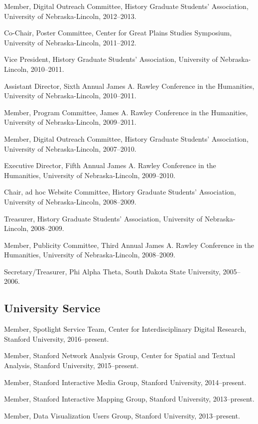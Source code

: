 Member, Digital Outreach Committee, History Graduate Students'
Association, University of Nebraska-Lincoln, 2012--2013.

Co-Chair, Poster Committee, Center for Great Plains Studies Symposium,
University of Nebraska-Lincoln, 2011--2012.

Vice President, History Graduate Students' Association, University of
Nebraska-Lincoln, 2010--2011.

Assistant Director, Sixth Annual James A. Rawley Conference in the
Humanities, University of Nebraska-Lincoln, 2010--2011.

Member, Program Committee, James A. Rawley Conference in the Humanities,
University of Nebraska-Lincoln, 2009--2011.

Member, Digital Outreach Committee, History Graduate Students'
Association, University of Nebraska-Lincoln, 2007--2010.

Executive Director, Fifth Annual James A. Rawley Conference in the
Humanities, University of Nebraska-Lincoln, 2009--2010.

Chair, ad hoc Website Committee, History Graduate Students' Association,
University of Nebraska-Lincoln, 2008--2009.

Treasurer, History Graduate Students' Association, University of
Nebraska-Lincoln, 2008--2009.

Member, Publicity Committee, Third Annual James A. Rawley Conference in
the Humanities, University of Nebraska-Lincoln, 2008--2009.

Secretary/Treasurer, Phi Alpha Theta, South Dakota State University,
2005--2006.

\subsection{University Service}\label{university-service}

Member, Spotlight Service Team, Center for Interdisciplinary Digital
Research, Stanford University, 2016--present.

Member, Stanford Network Analysis Group, Center for Spatial and Textual
Analysis, Stanford University, 2015--present.

Member, Stanford Interactive Media Group, Stanford University,
2014--present.

Member, Stanford Interactive Mapping Group, Stanford University,
2013--present.

Member, Data Visualization Users Group, Stanford University,
2013--present.

